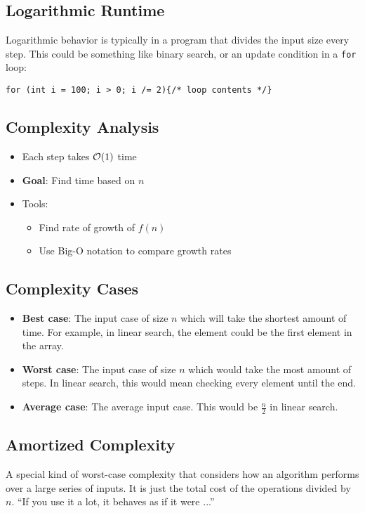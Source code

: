 \subsection{Logarithmic Runtime}
Logarithmic behavior is typically in a program that divides the input size every step. This could be something like binary search, or an update condition in a \lstinline[style=C++]{for} loop:
\begin{lstlisting}[style=C++]
for (int i = 100; i > 0; i /= 2){/* loop contents */}
\end{lstlisting}

\subsection{Complexity Analysis}
\begin{itemize}
	\item Each step takes $\mathcal{O}(1)$ time
	\item \textbf{Goal}: Find time based on $n$
	\item Tools:
	\begin{itemize}
		\item Find rate of growth of $f(n)$
		\item Use Big-O notation to compare growth rates
	\end{itemize}
\end{itemize}

\subsection{Complexity Cases}
\begin{itemize}
	\item \textbf{Best case}: The input case of size $n$ which will take the shortest amount of time. For example, in linear search, the element could be the first element in the array.
	\item \textbf{Worst case}: The input case of size $n$ which would take the most amount of steps. In linear search, this would mean checking every element until the end.
	\item \textbf{Average case}: The average input case. This would be $\frac{n}{2}$ in linear search.
\end{itemize}

\subsection{Amortized Complexity}
A special kind of worst-case complexity that considers how an algorithm performs over a large series of inputs. It is just the total cost of the operations divided by $n$. ``If you use it a lot, it behaves as if it were ...''

